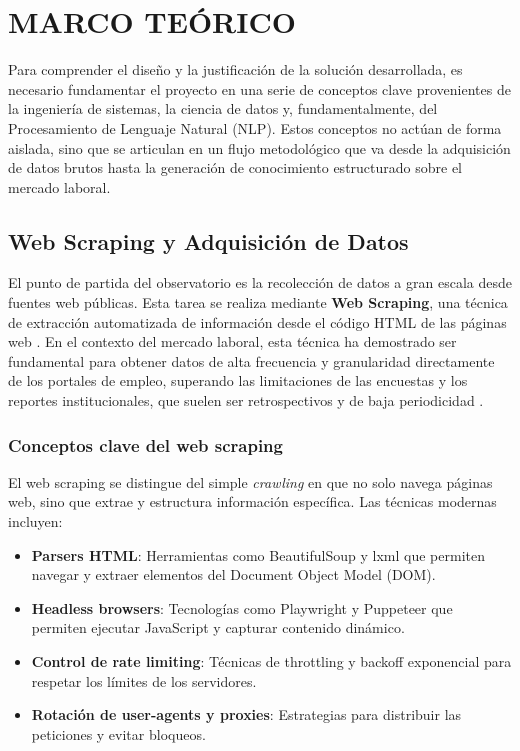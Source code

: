 \chapter{MARCO TEÓRICO}

Para comprender el diseño y la justificación de la solución desarrollada, es necesario fundamentar el proyecto en una serie de conceptos clave provenientes de la ingeniería de sistemas, la ciencia de datos y, fundamentalmente, del Procesamiento de Lenguaje Natural (NLP). Estos conceptos no actúan de forma aislada, sino que se articulan en un flujo metodológico que va desde la adquisición de datos brutos hasta la generación de conocimiento estructurado sobre el mercado laboral.

\section{Web Scraping y Adquisición de Datos}

El punto de partida del observatorio es la recolección de datos a gran escala desde fuentes web públicas. Esta tarea se realiza mediante \textbf{Web Scraping}, una técnica de extracción automatizada de información desde el código HTML de las páginas web \parencite{orozco2019webscraping}. En el contexto del mercado laboral, esta técnica ha demostrado ser fundamental para obtener datos de alta frecuencia y granularidad directamente de los portales de empleo, superando las limitaciones de las encuestas y los reportes institucionales, que suelen ser retrospectivos y de baja periodicidad \parencite{cardenas2015, rubio2024}.

\subsection{Conceptos clave del web scraping}

El web scraping se distingue del simple \textit{crawling} en que no solo navega páginas web, sino que extrae y estructura información específica. Las técnicas modernas incluyen:

\begin{itemize}
    \item \textbf{Parsers HTML}: Herramientas como BeautifulSoup y lxml que permiten navegar y extraer elementos del Document Object Model (DOM).
    \item \textbf{Headless browsers}: Tecnologías como Playwright y Puppeteer que permiten ejecutar JavaScript y capturar contenido dinámico.
    \item \textbf{Control de rate limiting}: Técnicas de throttling y backoff exponencial para respetar los límites de los servidores.
    \item \textbf{Rotación de user-agents y proxies}: Estrategias para distribuir las peticiones y evitar bloqueos.
\end{itemize}

